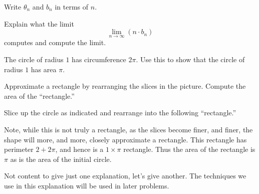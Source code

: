 \documentclass[newpage,hints,handout]{ximera}
\begin{document}
\begin{problem} Write $\theta_n$ and $b_n$ in terms of $n$.

Explain what the limit
\[
\lim_{n\to\infty} \left(n\cdot b_n\right)
\]
computes and compute the limit.
\end{problem}



\begin{problem}
The circle of radius $1$ has circumference $2\pi$. Use this to show
that the circle of radius $1$ has area $\pi$.
\begin{image}
\end{image}

\begin{hint}
Approximate a rectangle by rearranging the slices in the picture.
Compute the area of the ``rectangle.''
\end{hint}
\begin{freeResponse}
Slice up the circle as indicated and rearrange into the following
``rectangle.'' 
\begin{image}
\end{image}
Note, while this is not truly a rectangle, as the slices become finer,
and finer, the shape will more, and more, closely approximate a
rectangle. This rectangle has perimeter $2+2\pi$, and hence is a
$1\times \pi$ rectangle. Thus the area of the rectangle is $\pi$ as is
the area of the initial circle.
\end{freeResponse}
\end{problem}


Not content to give just one explanation, let's give another. The
techniques we use in this explanation will be used in later problems.
\end{document}
